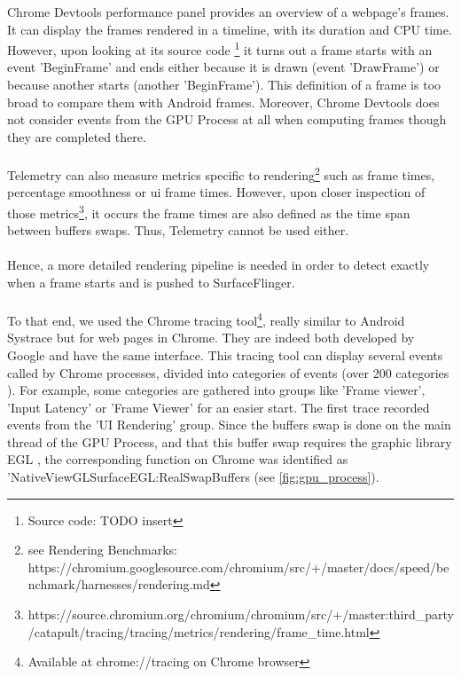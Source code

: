  Chrome Devtools performance panel provides an overview of a webpage's frames. It can display the frames rendered in a timeline, with its duration and CPU time. However, upon looking at its source code \footnote{Source code: TODO insert} it turns out a frame starts with an event 'BeginFrame' and ends either because it is drawn (event 'DrawFrame') or because another starts (another 'BeginFrame'). This definition of a frame is too broad to compare them with Android frames. Moreover, Chrome Devtools does not consider events from the GPU Process at all when computing frames though they are completed there.
 \paragraph{}
 Telemetry can also measure metrics specific to rendering\footnote{see Rendering Benchmarks: https://chromium.googlesource.com/chromium/src/+/master/docs/speed/benchmark/harnesses/rendering.md} such as frame times, percentage smoothness or ui frame times. However, upon closer inspection of those metrics\footnote{https://source.chromium.org/chromium/chromium/src/+/master:third_party/catapult/tracing/tracing/metrics/rendering/frame_time.html}, it occurs the frame times are also defined as the time span between buffers swaps. Thus, Telemetry cannot be used either.
 
 \paragraph{}
 Hence, a more detailed rendering pipeline is needed in order to detect exactly when a frame starts and is pushed to SurfaceFlinger.
 
 \paragraph{}
 To that end, we used the Chrome tracing tool\footnote{Available at chrome://tracing on Chrome browser}, really similar to Android Systrace but for web pages in Chrome. They are indeed both developed by Google and have the same interface. This tracing tool can display several events called by Chrome processes, divided into categories of events (over 200 categories \citationneeded). For example, some categories are gathered into groups like 'Frame viewer', 'Input Latency' or 'Frame Viewer' for an easier start. \newline
 The first trace recorded events from the 'UI Rendering' group. Since the buffers swap is done on the main thread of the GPU Process, and that this buffer swap requires the graphic library EGL 
 , the corresponding function on Chrome was identified as 'NativeViewGLSurfaceEGL:RealSwapBuffers (see \autoref{fig:gpu_process}).
 
